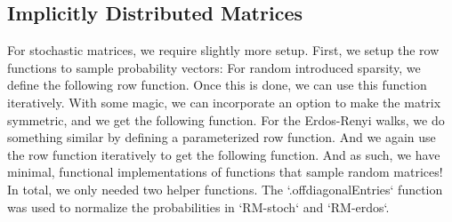 \newpage
\subsection{Implicitly Distributed Matrices}



For stochastic matrices, we require slightly more setup. First, we setup the row functions to sample probability vectors:
\trimm
\trimm
For random introduced sparsity, we define the following row function.
\trim
\trimm
Once this is done, we can use this function iteratively. With some magic, we can incorporate an option to make the matrix symmetric, and we get the following function.
\trimm
\newpage
{}
For the Erdos-Renyi walks, we do something similar by defining a parameterized row function.
\trimm
And we again use the row function iteratively to get the following function.
\trim
\trimm
And as such, we have minimal, functional implementations of functions that sample random matrices! In total, we only needed two helper functions. The `.offdiagonalEntries` function was used to normalize the probabilities in `RM-stoch` and `RM-erdos`.
\newpage
